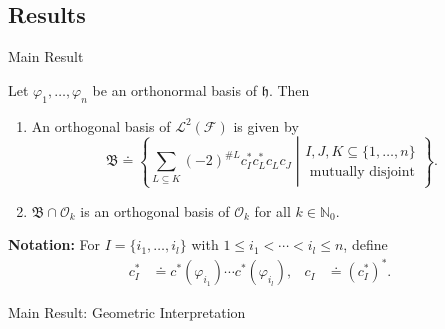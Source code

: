 \documentclass{beamer}
\newcommand{\IN}{\ensuremath{\mathbb{N}}}
\newcommand{\HS}{{\mathcal{L}^2(\FockSpace)}}
\newcommand{\HSbasis}{\mathfrak{B}}
\newcommand{\HilbertSpace}{\ensuremath{\mathfrak{h}}}
\newcommand{\FockSpace}{\mathcal{F}}
\newcommand{\DensityMatrices}{\mathcal{D}}
\newcommand{\kbOp}[1][k]{{\ensuremath{\mathcal{O}_{#1}}}}
\begin{document}
\subsection{Results}
\begin{frame}{Main Result}
    \begin{theorem}
        Let $\varphi_1,\ldots,\varphi_n$ be an orthonormal basis of $\HilbertSpace$. Then 
        \begin{enumerate}
          \item An orthogonal basis of $\HS$ is given by
            \begin{equation*}
              \HSbasis\doteq\left\{
                \left.\sum_{L\subseteq K}(-2)^{\#L}c_I^*c_L^*c_Lc_J\;\right|
                \begin{gathered}
                  I,J,K\subseteq\{1,\ldots,n\}\\\text{ mutually disjoint}
                \end{gathered}
              \right\}.
            \end{equation*}
          \item $\HSbasis\cap\kbOp$ is an orthogonal basis of $\kbOp$ for all $k\in\IN_0$.
        \end{enumerate}
    \end{theorem}
    \textbf{Notation:} For $I=\{i_1,\ldots,i_l\}$ with $1\le i_1<\cdots<i_l\le n$, define
    \begin{align*}
        c_I^*&\doteq c^*(\varphi_{i_1})\cdots c^*(\varphi_{i_l}),&
        c_I&\doteq\left(c_I^*\right)^*.
    \end{align*}
\end{frame}

\begin{frame}{Main Result: Geometric Interpretation}
    \begin{figure}
\end{figure}
\end{frame}
\end{document}
